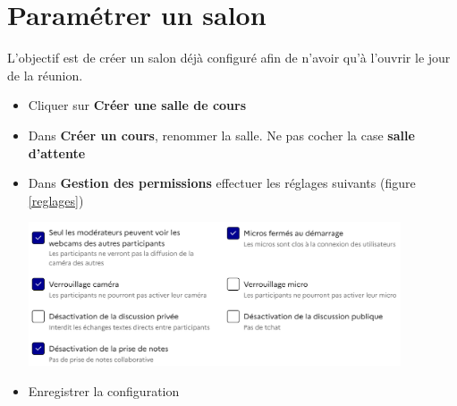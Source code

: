 \documentclass[a4paper,11pt]{article}
\begin{document}
\section{Paramétrer un salon}
L'objectif est de créer un salon déjà configuré afin de n'avoir qu'à l'ouvrir le jour de la réunion.
\begin{itemize}
    \item Cliquer sur \textbf{Créer une salle de cours}
    \item Dans \textbf{Créer un cours}, renommer la salle. Ne pas cocher la case \textbf{salle d'attente}
    \item Dans \textbf{Gestion des permissions} effectuer les réglages suivants (figure \ref{reglages})
          \begin{center}
              \centering
              \includegraphics[width=11cm]{ressources/reglages.png}
              \label{reglages}
          \end{center}
    \item Enregistrer la configuration
\end{itemize}
\end{document}
